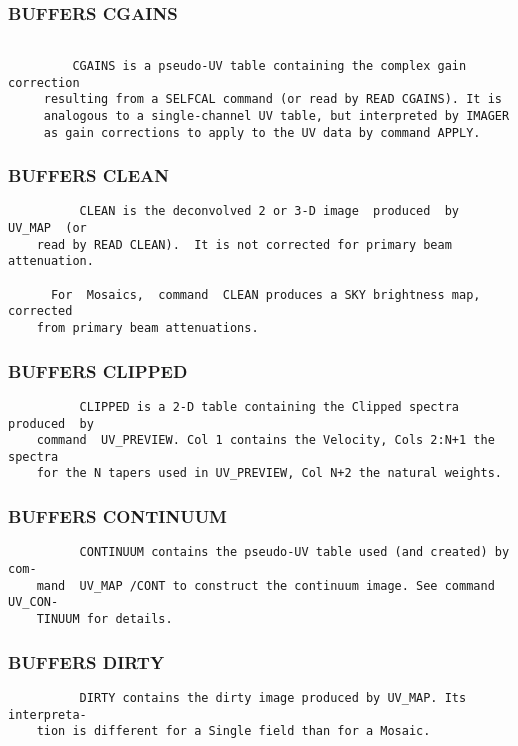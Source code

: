 \subsubsection{BUFFERS CGAINS}
\begin{verbatim}

         CGAINS is a pseudo-UV table containing the complex gain correction
     resulting from a SELFCAL command (or read by READ CGAINS). It is
     analogous to a single-channel UV table, but interpreted by IMAGER
     as gain corrections to apply to the UV data by command APPLY.

\end{verbatim}
\subsubsection{BUFFERS CLEAN}
\begin{verbatim}
          CLEAN is the deconvolved 2 or 3-D image  produced  by  UV_MAP  (or
    read by READ CLEAN).  It is not corrected for primary beam attenuation.

      For  Mosaics,  command  CLEAN produces a SKY brightness map, corrected
    from primary beam attenuations.

\end{verbatim}
\subsubsection{BUFFERS CLIPPED}
\begin{verbatim}
          CLIPPED is a 2-D table containing the Clipped spectra produced  by
    command  UV_PREVIEW. Col 1 contains the Velocity, Cols 2:N+1 the spectra
    for the N tapers used in UV_PREVIEW, Col N+2 the natural weights.

\end{verbatim}
\subsubsection{BUFFERS CONTINUUM}
\begin{verbatim}
          CONTINUUM contains the pseudo-UV table used (and created) by  com-
    mand  UV_MAP /CONT to construct the continuum image. See command UV_CON-
    TINUUM for details.

\end{verbatim}
\subsubsection{BUFFERS DIRTY}
\begin{verbatim}
          DIRTY contains the dirty image produced by UV_MAP. Its interpreta-
    tion is different for a Single field than for a Mosaic.

\end{verbatim}
